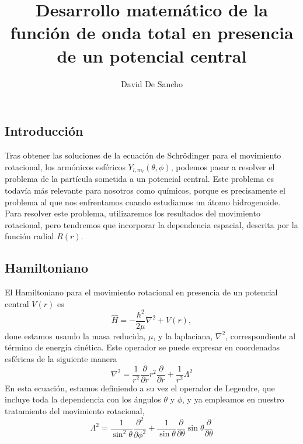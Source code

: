 \documentclass[notitlepage, amsmath,amssymb,
 aps,12pt,tightenlines]{revtex4-1}
\begin{document}
\title{Desarrollo matemático de la función de onda total en presencia de un potencial central}%

\author{David De Sancho}


\maketitle

\subsection*{Introducción}
Tras obtener las soluciones de la ecuación de
Schrödinger para el movimiento rotacional, los
armónicos esféricos $Y_{l,m_l}(\theta ,\phi)$,
podemos pasar a resolver el problema
de la partícula sometida a un potencial
central. Este problema es todavía más relevante para
nosotros como químicos, porque es precisamente el 
problema al que nos enfrentamos cuando estudiamos
un átomo hidrogenoide. 
Para resolver este problema, utilizaremos los resultados 
del movimiento rotacional, pero tendremos que 
incorporar la dependencia espacial, descrita por
la función radial $R(r)$.

\subsection*{Hamiltoniano}
El Hamiltoniano para el movimiento rotacional en presencia
de un potencial central $V(r)$ es
\begin{equation}
    \hat{H}=-\frac{\hbar^2}{2\mu}\nabla^2 +V(r),
\end{equation}
done estamos usando la masa reducida, $\mu$, y la laplaciana, 
$\nabla^2$, correspondiente al término de energía cinética.
Este operador se puede expresar en coordenadas 
esféricas  de la siguiente manera
\begin{equation}
    \nabla^2=\frac{1}{r^2}\frac{\partial}{\partial r}r^2\frac{\partial}{\partial r} + \frac{1}{r^2}\Lambda^2
\end{equation}
En esta ecuación, estamos definiendo a su vez el operador de Legendre,
que incluye toda la dependencia con los ángulos $\theta$
y $\phi$, y ya empleamos en nuestro tratamiento del movimiento
rotacional,
\begin{equation}
    \Lambda^2=\frac{1}{\sin^2\theta}\frac{\partial^2}{\partial\phi^2}+
    \frac{1}{\sin\theta}\frac{\partial}{\partial\theta}\sin\theta\frac{\partial}{\partial\theta}
\end{equation}
\end{document}
